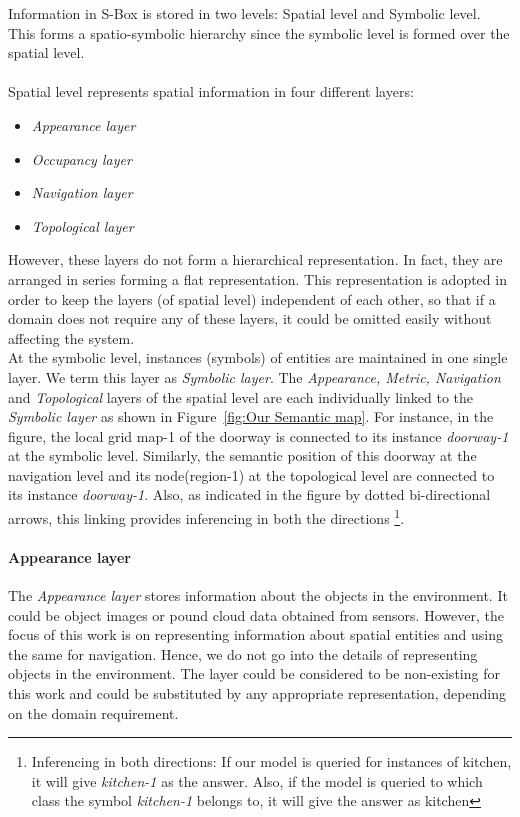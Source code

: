 Information in S-Box is stored in two levels: Spatial level and Symbolic level.\\
This forms a spatio-symbolic hierarchy \cite{3} since the symbolic level is formed over the spatial level.\\\\
Spatial level represents spatial information in four different layers\cite{2, 7}:
\begin{itemize}
 \item \textit{Appearance layer}
 \item \textit{Occupancy layer}
 \item \textit{Navigation layer}
 \item \textit{Topological layer}
\end{itemize}
However, these layers do not form a hierarchical representation. In fact, they are arranged in series 
forming a flat representation. This representation is adopted in order to keep the layers (of spatial level) independent 
of each other, so that if a domain does not require any of these layers, it could be omitted easily without affecting the system. \\

At the symbolic level, instances (symbols) of entities are maintained in one single layer. We term this layer as \textit{Symbolic layer}.  
The \textit{Appearance, Metric, Navigation} and \textit{Topological} layers of the spatial level are each individually linked to the \textit{Symbolic layer} as shown in Figure~\ref{fig:Our Semantic map}. 
For instance, in the figure, the local grid map-1 of the doorway is connected to its instance \textit{doorway-1} at the symbolic level. 
Similarly, the semantic position of this doorway at the navigation level and its node(region-1) at the topological level are connected to its instance \textit{doorway-1}.
Also, as indicated in the figure by dotted bi-directional arrows, this linking provides inferencing in both the directions \footnote[4]{Inferencing in both directions: If our model is queried for instances of kitchen, it will give \textit{kitchen-1} as the answer. 
Also, if the model is queried to which class the symbol \textit{kitchen-1} belongs to, it will give the answer as kitchen}.

\paragraph{Appearance layer}
The \textit{Appearance layer} stores information about the objects in the environment.
It could be object images or pound cloud data obtained from sensors.
However, the focus of this work is on representing information about spatial entities and using the same for navigation.
Hence, we do not go into the details of representing objects in the environment. 
The layer could be considered to be non-existing for this work and could be substituted by any appropriate representation, 
depending on the domain requirement.

